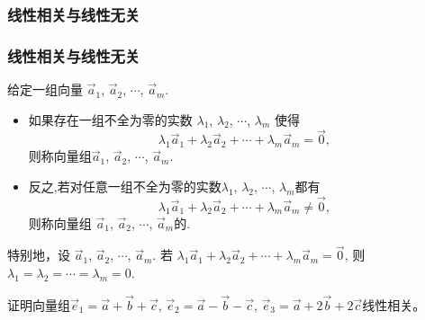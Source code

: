 \subsubsection{线性相关与线性无关}
\begin{frame}\frametitle{线性相关与线性无关}
\begin{definition} 给定一组向量 $\vec{a}_1$, $\vec{a}_2$, $\cdots$, $\vec{a}_m$.
\begin{itemize}
\item 如果存在一组不全为零的实数 $\lambda_1$, $\lambda_2$, $\cdots$, $\lambda_m$ 使得
\[\lambda_1\vec{a}_1 + \lambda_2\vec{a}_2 + \cdots + \lambda_m\vec{a}_m=\vec{0},\]
则称向量组$\vec{a}_1$, $\vec{a}_2$, $\cdots$, $\vec{a}_m$.
\pp
\item 反之,若对任意一组不全为零的实数$\lambda_1$, $\lambda_2$, $\cdots$, $\lambda_m$都有
\[\lambda_1\vec{a}_1 + \lambda_2\vec{a}_2 + \cdots + \lambda_m\vec{a}_m\neq \vec{0},\]
则称向量组 $\vec{a}_1$, $\vec{a}_2$, $\cdots$, $\vec{a}_m$的.
\end{itemize}
\end{definition}
\pp
\bigskip

特别地，设 $\vec{a}_1$, $\vec{a}_2$, $\cdots$, $\vec{a}_m$. 若 $\lambda_1\vec{a}_1 + \lambda_2\vec{a}_2 + \cdots + \lambda_m\vec{a}_m= \vec{0}$, 则
$\lambda_1=\lambda_2= \cdots=\lambda_m=0$.

\pp
\bigskip

%
%



\begin{example}证明向量组$\vec{e}_1=\vec{a}+\vec{b}+\vec{c}$, $\vec{e}_2=\vec{a}-\vec{b}-\vec{c}$, $\vec{e}_3=\vec{a}+2\vec{b}+2\vec{c}$线性相关。
\end{example}

\pp

\end{frame}





